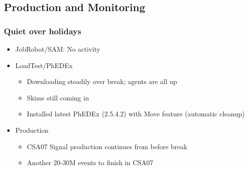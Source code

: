 \documentclass{beamer}
\begin{document}
\subsection{Production and Monitoring}
\begin{frame}
\frametitle{Quiet over holidays}
\begin{itemize}
    \item JobRobot/SAM: No activity
    \item LoadTest/PhEDEx
    \begin{itemize}
        \item Downloading steadily over break; agents are all up
        \item Skims still coming in
        \item Installed latest PhEDEx (2.5.4.2) with Move feature (automatic cleanup)
    \end{itemize}
    \item Production
    \begin{itemize}
        \item CSA07 Signal production continues from before break
        \item Another 20-30M events to finish in CSA07
    \end{itemize}
\end{itemize}
\end{frame}
\end{document}
